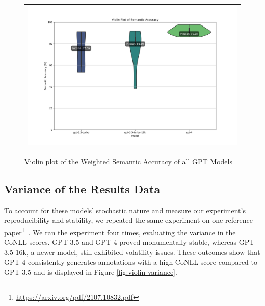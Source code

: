 \begin{figure}[htpb]
  \centering
  \begin{tabular}{c}
  \includegraphics[width=14cm]{images/semantic-accuracy.png}
  \end{tabular}
  \caption[Semantic Accuracy]{Violin plot of the Weighted Semantic Accuracy of all GPT Models}\label{fig:violin-semantic}
\end{figure}

\subsection{Variance of the Results Data}

To account for these models' stochastic nature and measure our experiment's reproducibility and stability, we repeated the same experiment on one reference paper\footnote{\url{https://arxiv.org/pdf/2107.10832.pdf}}~\citep{singleton2021logic}. We ran the experiment four times, evaluating the variance in the CoNLL scores. GPT-3.5 and GPT-4 proved monumentally stable, whereas GPT-3.5-16k, a newer model, still exhibited volatility issues. These outcomes show that GPT-4 consistently generates annotations with a high CoNLL score compared to GPT-3.5 and is displayed in Figure \ref{fig:violin-variance}.


